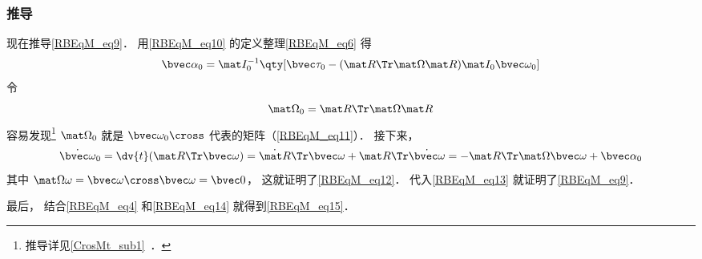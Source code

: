 \subsubsection{推导}
现在推导\autoref{RBEqM_eq9}． 用\autoref{RBEqM_eq10} 的定义整理\autoref{RBEqM_eq6} 得
\begin{equation}\label{RBEqM_eq13}
\bvec\alpha_0 = \mat I_0^{-1} \qty[\bvec \tau_0  - (\mat R\Tr\mat\Omega\mat R) \mat I_0 \bvec\omega_0]
\end{equation}
令
\begin{equation}\label{RBEqM_eq14}
\mat\Omega_0 = \mat R\Tr\mat\Omega\mat R
\end{equation}
容易发现\footnote{推导详见\autoref{CrosMt_sub1}~．} $\mat\Omega_0$ 就是 $\bvec\omega_0\cross$ 代表的矩阵（\autoref{RBEqM_eq11}）． 接下来，
\begin{equation}
\dot{\bvec\omega}_0
= \dv{t}(\mat R\Tr \bvec\omega)
= \dot{\mat R}\Tr \bvec\omega + {\mat R}\Tr \dot{\bvec\omega}
= -\mat R\Tr\mat\Omega\bvec\omega + \bvec\alpha_0
\end{equation}
其中 $\mat\Omega\omega = \bvec\omega\cross\bvec\omega = \bvec 0$， 这就证明了\autoref{RBEqM_eq12}． 代入\autoref{RBEqM_eq13} 就证明了\autoref{RBEqM_eq9}．

最后， 结合\autoref{RBEqM_eq4} 和\autoref{RBEqM_eq14} 就得到\autoref{RBEqM_eq15}．
